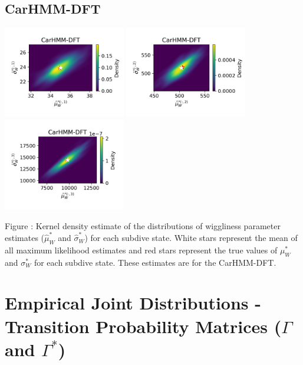 \documentclass{article}
\begin{document}
        \subsection{CarHMM-DFT}
        \begin{center}
        \includegraphics[width=2.1in]{../Plots/hmm_FV_MLE_density_FoVeDBA_0_0.png}
        \includegraphics[width=2.1in]{../Plots/hmm_FV_MLE_density_FoVeDBA_0_1.png}
        \includegraphics[width=2.1in]{../Plots/hmm_FV_MLE_density_FoVeDBA_0_2.png}
        \end{center}
        
        \noindent Figure : Kernel density estimate of the distributions of wiggliness parameter estimates ($\hat \mu^*_W$ and $\hat \sigma^*_W$) for each subdive state. White stars represent the mean of all maximum likelihood estimates and red stars represent the true values of $\mu^*_W$ and $\sigma^*_W$ for each subdive state. These estimates are for the CarHMM-DFT.
        \addtocounter{fignum}{1}
        
    \newpage
    \section{Empirical Joint Distributions - Transition Probability Matrices ($\Gamma$ and $\Gamma^*$)}
        
\end{document}
